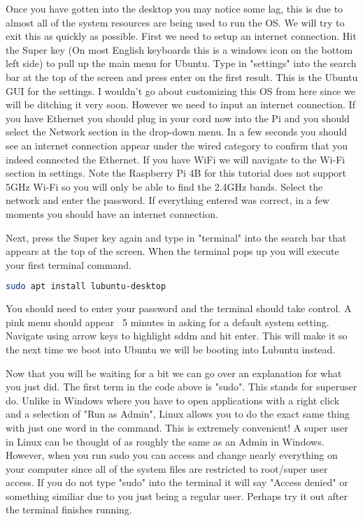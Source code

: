 \documentclass[letterpaper,12pt,notitlepage]{report} %
\begin{document}
Once you have gotten into the desktop you may notice some lag, this is due to almost all of the system resources are being used to run the OS. We will try to exit this as quickly as possible. First we need to setup an internet connection. Hit the Super key (On most English keyboards this is a windows icon on the bottom left side) to pull up the main menu for Ubuntu. Type in "settings" into the search bar at the top of the screen and press enter on the first result. This is the Ubuntu GUI for the settings. I wouldn't go about customizing this OS from here since we will be ditching it very soon. However we need to input an internet connection. If you have Ethernet you should plug in your cord now into the Pi and you should select the Network section in the drop-down menu. In a few seconds you should see an internet connection appear under the wired category to confirm that you indeed connected the Ethernet. If you have WiFi we will navigate to the Wi-Fi section in settings. Note the Raspberry Pi 4B for this tutorial does not support 5GHz Wi-Fi so you will only be able to find the 2.4GHz bands. Select the network and enter the password. If everything entered was correct, in a few moments you should have an internet connection.

Next, press the Super key again and type in "terminal" into the search bar that appears at the top of the screen. When the terminal pops up you will execute your first terminal command. 

\begin{lstlisting}[language=bash]
	sudo apt install lubuntu-desktop
\end{lstlisting}

You should need to enter your password and the terminal should take control. A pink menu should appear ~5 minutes in asking for a default system setting. Navigate using arrow keys to highlight sddm and hit enter. This will make it so the next time we boot into Ubuntu we will be booting into Lubuntu instead. 

Now that you will be waiting for a bit we can go over an explanation for what you just did. The first term in the code above is "sudo". This stands for superuser do. Unlike in Windows where you have to open applications with a right click and a selection of "Run as Admin", Linux allows you to do the exact same thing with just one word in the command. This is extremely convenient! A super user in Linux can be thought of as roughly the same as an Admin in Windows. However, when you run sudo you can access and change nearly everything on your computer since all of the system files are restricted to root/super user access. If you do not type "sudo" into the terminal it will say "Access denied" or something similiar due to you just being a regular user. Perhaps try it out after the terminal finishes running.
\end{document}
